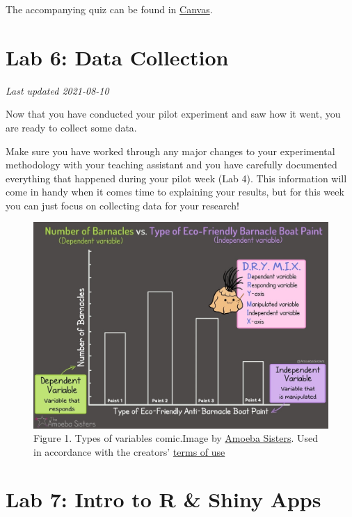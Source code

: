 \documentclass[
]{book}
\begin{document}
The accompanying quiz can be found in \href{https://canvas.ubc.ca}{Canvas}.

\hypertarget{lab-6-data-collection}{%
\chapter*{Lab 6: Data Collection}\label{lab-6-data-collection}}

\emph{Last updated 2021-08-10}

Now that you have conducted your pilot experiment and saw how it went, you are ready to collect some data.

Make sure you have worked through any major changes to your experimental methodology with your teaching assistant and you have carefully documented everything that happened during your pilot week (Lab 4). This information will come in handy when it comes time to explaining your results, but for this week you can just focus on collecting data for your research!

\begin{figure}
\centering
\includegraphics{figures_images/Lab6-Fig1.jpg}
\caption{Figure 1. Types of variables comic.Image by \href{https://www.amoebasisters.com/parameciumparlorcomics/category/nature-of-science/2}{Amoeba Sisters}. Used in accordance with the creators' \href{https://www.amoebasisters.com/termsofuse.html}{terms of use}}
\end{figure}

\hypertarget{lab-7-intro-to-r-shiny-apps}{%
\chapter*{Lab 7: Intro to R \& Shiny Apps}\label{lab-7-intro-to-r-shiny-apps}}
\end{document}
